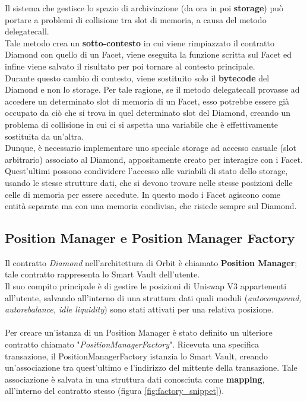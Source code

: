 \documentclass[12pt,a4paper]{report}
\begin{document}
\noindent Il sistema che gestisce lo spazio di archiviazione (da ora in poi \textbf{storage}) può portare a problemi di collisione tra slot di memoria, a causa del metodo delegatecall.
\\Tale metodo crea un \textbf{sotto-contesto} in cui viene rimpiazzato il contratto Diamond con quello di un Facet, viene eseguita la funzione scritta sul Facet ed infine viene salvato il risultato per poi tornare al contesto principale. 
\\Durante questo cambio di contesto, viene sostituito solo il \textbf{bytecode} del Diamond e non lo storage. Per tale ragione, se il metodo delegatecall provasse ad accedere un determinato slot di memoria di un Facet, esso potrebbe essere già occupato da ciò che si trova in quel determinato slot del Diamond, creando un problema di collisione in cui ci si aspetta una variabile che è effettivamente sostituita da un'altra.\\Dunque, è necessario implementare uno speciale storage ad accesso casuale (slot arbitrario) associato al Diamond, appositamente creato per interagire con i Facet.
\\Quest'ultimi possono condividere l'accesso alle variabili di stato dello storage, usando le stesse strutture dati, che si devono trovare nelle stesse posizioni delle celle di memoria per essere accedute. In questo modo i Facet agiscono come entità separate ma con una memoria condivisa, che risiede sempre sul Diamond.





\subsection{Position Manager e Position Manager Factory}

Il contratto \textit{Diamond} nell'architettura di Orbit è chiamato \textbf{Position Manager}; tale contratto rappresenta lo Smart Vault dell'utente.\\Il suo compito principale è di gestire le posizioni di Uniswap V3 appartenenti all'utente, salvando all'interno di una struttura dati quali moduli (\textit{autocompound, autorebalance, idle liquidity}) sono stati attivati per una relativa posizione.
\\\\Per creare un'istanza di un Position Manager è stato definito un ulteriore contratto chiamato "\textit{PositionManagerFactory}". Ricevuta una specifica transazione, il PositionManagerFactory istanzia lo Smart Vault, creando un'associazione tra quest'ultimo e l'indirizzo del mittente della transazione. Tale associazione è salvata in una struttura dati conosciuta come \textbf{mapping}, all'interno del contratto stesso (figura \ref{fig:factory_snippet}). 
\end{document}
